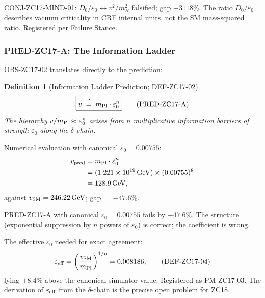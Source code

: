 \documentclass[12pt, a4paper]{article}
\newtheorem{definition}{Definition}[section]
\begin{document}
\begin{formalbox}[title={Phase Misalignment PM-ZC17-02 (Registered)}]
CONJ-ZC17-MIND-01: $D_0/\varepsilon_0 \leftrightarrow v^2/m_H^2$
falsified; gap $+3118\%$. The ratio $D_0/\varepsilon_0$
describes vacuum criticality in CRF internal units, not the
SM mass-squared ratio. Registered per Failure Stance.
\end{formalbox}

\subsubsection{PRED-ZC17-A: The Information Ladder}

OBS-ZC17-02 translates directly to the prediction:

\begin{definition}[Information Ladder Prediction; DEF-ZC17-02]
\label{zc17:def:info-ladder}
\begin{equation}
  \boxed{v \;\stackrel{?}{=}\; m_{\rm Pl}\cdot\varepsilon_0^n}
  \tag{PRED-ZC17-A}\label{zc17:eq:pred-A}
\end{equation}
The hierarchy $v/m_{\rm Pl}\approx\varepsilon_0^n$ arises from
$n$ multiplicative information barriers of strength $\varepsilon_0$
along the $\delta$-chain.
\end{definition}

Numerical evaluation with canonical $\varepsilon_0=0.00755$:
\begin{align}
  v_{\rm pred}
  &= m_{\rm Pl}\cdot\varepsilon_0^n
  \nonumber\\
  &= (1.221\times10^{19}\,\mathrm{GeV})\times(0.00755)^8
  \nonumber\\
  &= 128.9\,\mathrm{GeV},
  \label{zc17:eq:pred-A-num}
\end{align}
against $v_{\rm SM}=246.22\,\mathrm{GeV}$; gap $=-47.6\%$.

\begin{formalbox}[title={Phase Misalignment PM-ZC17-03 (Registered)}]
PRED-ZC17-A with canonical $\varepsilon_0=0.00755$ fails by
$-47.6\%$. The structure (exponential suppression by $n$ powers
of $\varepsilon_0$) is correct; the coefficient is wrong.

The effective $\varepsilon_0$ needed for exact agreement:
\begin{equation}
  \varepsilon_{\rm eff}
  = \left(\frac{v_{\rm SM}}{m_{\rm Pl}}\right)^{1/n}
  = 0.008186,
  \tag{DEF-ZC17-04}\label{zc17:eq:eps-eff}
\end{equation}
lying $+8.4\%$ above the canonical simulator value.
Registered as PM-ZC17-03. The derivation of $\varepsilon_{\rm eff}$
from the $\delta$-chain is the precise open problem for ZC18.
\end{formalbox}
\end{document}
